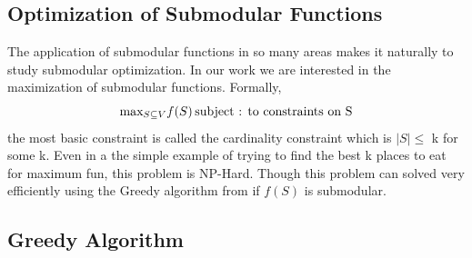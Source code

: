 \documentclass[a4paper,twoside]{iiththesis}
\theoremstyle{definition}
\theoremstyle{definition}
\theoremstyle{remark}
\begin{document}
\subsection{Optimization of Submodular Functions}
The application of submodular functions in so many areas makes it naturally to study submodular optimization. In our work we are interested in the maximization of submodular functions. Formally,  
\begin{equation}
	\text{max}_{S\subseteq V} f(S) \hspace{1.8pt} \text{subject : to constraints on S}
\end{equation}
the most basic constraint is called the cardinality constraint which is $ |S| \leq$ k for some k. Even in a the simple example of trying to find the best k places to eat for maximum fun, this problem is NP-Hard. Though this problem can solved very efficiently using the Greedy algorithm from \cite{nemhauser} if $f(S)$ is submodular. 

\subsection{Greedy Algorithm}
\end{document}
